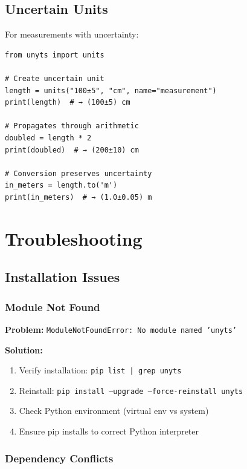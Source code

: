\documentclass[11pt,a4paper]{report}
\begin{document}
\section{Uncertain Units}

For measurements with uncertainty:

\begin{lstlisting}[style=pythonstyle]
from unyts import units

# Create uncertain unit
length = units("100±5", "cm", name="measurement")
print(length)  # → (100±5) cm

# Propagates through arithmetic
doubled = length * 2
print(doubled)  # → (200±10) cm

# Conversion preserves uncertainty
in_meters = length.to('m')
print(in_meters)  # → (1.0±0.05) m
\end{lstlisting}


\chapter{Troubleshooting}

\section{Installation Issues}

\subsection{Module Not Found}

\textbf{Problem:} \texttt{ModuleNotFoundError: No module named 'unyts'}

\textbf{Solution:}
\begin{enumerate}
\item Verify installation: \texttt{pip list | grep unyts}
\item Reinstall: \texttt{pip install --upgrade --force-reinstall unyts}
\item Check Python environment (virtual env vs system)
\item Ensure pip installs to correct Python interpreter
\end{enumerate}

\subsection{Dependency Conflicts}
\end{document}
